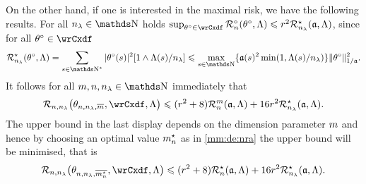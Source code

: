 \begin{rem*}
\medskip

On the other hand, if one is interested in the maximal risk, we have the following results.
For all $\ssE\in\N$ holds
$\sup_{\xdf\in\rwCxdf}\oRa{\xdf,\Lambda}\leq
\xdfCr^2\mmRa{\xdfCw[],\Lambda}$, since for all
$\xdf\in\rwCxdf$ 
\begin{equation}
  \mmRa{\xdf,\Lambda}=\sum_{s\in\N^{\star}} \vert \fxdf[(s)] \vert ^2[1\wedge \iSv[s]/\ssE]\leq
\max_{s\in\N}\{\xdfCw[(s)]^2\min(1,\iSv[s]/\ssE)\}\Vnorm[1/{\xdfCw[]}]{\xdf}^2.
\end{equation}
It follows for all $\Di,\ssY,\ssE\in\N$ immediately that 
\begin{equation}
  \nmRi{\hxdfPr}{\rwCxdf,\Lambda}
  \leq (\xdfCr^2+8) \dRa{\Di}{\xdfCw[],\Lambda}+16\xdfCr^2\mmRa{\xdfCw[],\Lambda}.
\end{equation}
The upper bound in the last display depends on the dimension parameter
$m$ and hence by choosing an optimal value $m_{n}^\star$ as in
\eqref{mm:de:nra} the upper bound
will be minimised, that is
\begin{equation}
  \nmRi{\hxdfPr[\mnDi]}{\rwCxdf,\Lambda}
  \leq (\xdfCr^2+8) \mnRa{\xdfCw[],\Lambda}+16\xdfCr^2\mmRa{\xdfCw[],\Lambda}.
\end{equation}

\medskip


\end{rem*}
